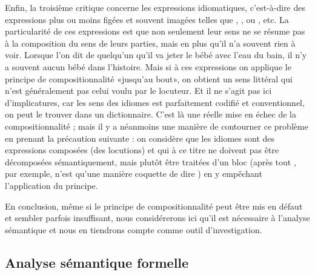 Enfin, la troisième critique concerne les expressions idiomatiques,
c'est-à-dire des expressions plus ou moins figées et souvent imagées
telles que  , ,
 ou ,
etc.  La particularité de ces expressions est que non seulement leur
sens ne se résume pas à la composition du sens de leurs parties, mais
en plus qu'il n'a souvent rien à voir.  Lorsque l'on dit de quelqu'un
qu'il va jeter le bébé avec l'eau du bain, il n'y a souvent aucun bébé
dans l'histoire. Mais si à ces expressions on  applique le
principe de compositionnalité «jusqu'au bout», on obtient un sens
littéral qui n'est généralement pas celui voulu par le locuteur.  Et
il ne s'agit pas ici d'implicatures, car les sens des idiomes est
parfaitement codifié et conventionnel, on peut le trouver dans un
dictionnaire.  C'est là une réelle mise en échec de la
compositionnalité ; mais il y a néanmoins une manière de contourner ce
problème en prenant la précaution suivante : on considère que les
idiomes sont des expressions composées (des locutions) et qui à ce
titre ne doivent pas être décomposées sémantiquement, mais plutôt être
traitées d'un bloc (après tout , par exemple,
n'est qu'une manière coquette de dire ) en y empêchant
l'application du principe.   

En conclusion, même si le principe de compositionnalité peut être mis
en défaut et sembler parfois insuffisant, nous considérerons ici qu'il
est nécessaire à l'analyse sémantique et nous en tiendrons compte
comme outil d'investigation.

\subsection{Analyse sémantique formelle}

